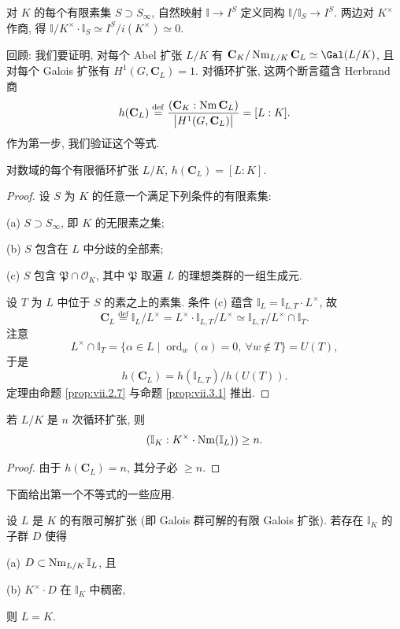 对 $K$ 的每个有限素集 $S\supset S_{\infty}$, 自然映射 $\mathbb{I}\to I^{S}$ 定义同构 $\mathbb{I}/\mathbb{I}_{S}\to I^{S}$. 两边对 $K^{\times}$ 作商, 得 $\mathbb{I}/K^{\times}\cdot\mathbb{I}_{S}\simeq I^{S}/i(K^{\times})\simeq 0$.

回顾: 我们要证明, 对每个 Abel 扩张 $L/K$ 有 $\mathbf{C}_K/\Nm_{L/K}\mathbf{C}_L\simeq\Gal(L/K)$, 且对每个 Galois 扩张有 $H^{1}(G,\mathbf{C}_L)=1$. 对循环扩张, 这两个断言蕴含 Herbrand 商
\[
h(\mathbf{C}_{L})\overset{\mathrm{def}}{=}\frac{(\mathbf{C}_{K}:\operatorname{Nm}\mathbf{C}_{L})}{\bigl|H^{1}(G,\mathbf{C}_{L})\bigr|}=[L:K].
\]
作为第一步, 我们验证这个等式.

\begin{theorem}\label{thm:vii.4.3}
对数域的每个有限循环扩张 $L/K$, $h(\mathbf{C}_L)=[L:K]$.
\end{theorem}

\begin{proof}
设 $S$ 为 $K$ 的任意一个满足下列条件的有限素集:

(a) $S\supset S_{\infty}$, 即 $K$ 的无限素之集;

(b) $S$ 包含在 $L$ 中分歧的全部素;

(c) $S$ 包含 $\mathfrak{P}\cap\mathcal{O}_K$, 其中 $\mathfrak{P}$ 取遍 $L$ 的理想类群的一组生成元.

设 $T$ 为 $L$ 中位于 $S$ 的素之上的素集. 条件 (c) 蕴含 $\mathbb{I}_L=\mathbb{I}_{L,T}\cdot L^{\times}$, 故
\[
\mathbf{C}_{L}\overset{\mathrm{def}}{=}\mathbb{I}_{L}/L^{\times}=L^{\times}\cdot\mathbb{I}_{L,T}/L^{\times}\simeq\mathbb{I}_{L,T}/L^{\times}\cap\mathbb{I}_{T}.
\]
注意
\[
L^{\times}\cap\mathbb{I}_{T}=\{\alpha\in L\mid\operatorname{ord}_{w}(\alpha)=0,\ \forall w\notin T\}=U(T),
\]
于是
\[
h(\mathbf{C}_{L})=h(\mathbb{I}_{L,T})/h(U(T)).
\]
定理由命题 \ref{prop:vii.2.7} 与命题 \ref{prop:vii.3.1} 推出.
\end{proof}

\begin{corollary}[第一个不等式]\label{cor:vii.4.4}
若 $L/K$ 是 $n$ 次循环扩张, 则
\[
(\mathbb{I}_{K}:K^{\times}\cdot\operatorname{Nm}(\mathbb{I}_{L}))\ge n.
\]
\end{corollary}

\begin{proof}
由于 $h(\mathbf{C}_L)=n$, 其分子必 $\ge n$.
\end{proof}

下面给出第一个不等式的一些应用.

\begin{lemma}\label{lem:vii.4.5}
设 $L$ 是 $K$ 的有限可解扩张 (即 Galois 群可解的有限 Galois 扩张). 若存在 $\mathbb{I}_K$ 的子群 $D$ 使得

(a) $D\subset\operatorname{Nm}_{L/K}\mathbb{I}_L$, 且

(b) $K^{\times}\cdot D$ 在 $\mathbb{I}_K$ 中稠密,

则 $L=K$.
\end{lemma}


